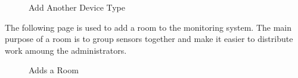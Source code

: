 \documentclass{report}
\begin{document}
\begin{figure}[H]
\caption{Add Another Device Type}
\end{figure}

The following page is used to add a room to the monitoring system.
The main purpose of a room is to group sensors together and make it easier to distribute work amoung the administrators.

\begin{figure}[H]
\caption{Adds a Room}
\end{figure}
\end{document}

